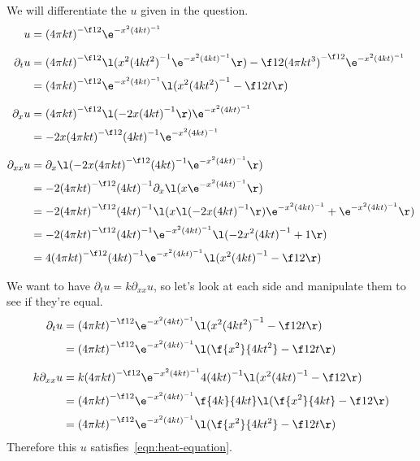 \documentclass[a4paper]{article}
\begin{document}
We will differentiate the $u$ given in the question.
\begin{align*}
u &= {(4\pi kt)}^{-\f12} \e^{-x^2 {(4kt)}^{-1}} \\[1.5ex]
%
\partial_t u &= {(4\pi kt)}^{-\f12} \l( x^2 {(4k t^2)}^{-1} \e^{-x^2 {(4kt)}^{-1}} \r)
    - \f12 {(4\pi k t^3)}^{-\f12} \e^{-x^2 {(4kt)}^{-1}} \\[0.5ex]
&= {(4\pi kt)}^{-\f12} \e^{-x^2 {(4kt)}^{-1}} \l(
    x^2 {(4k t^2)}^{-1} - \f1{2t}
\r) \\[1.5ex]
%
\partial_x u &= {(4\pi kt)}^{-\f12} \l( -2x {(4kt)}^{-1} \r) \e^{-x^2 {(4kt)}^{-1}} \\[0.5ex]
&= -2x {(4\pi kt)}^{-\f12} {(4kt)}^{-1} \e^{-x^2 {(4kt)}^{-1}} \\[1.5ex]
%
\partial_{xx} u &= \partial_x \l( -2x {(4\pi kt)}^{-\f12} {(4kt)}^{-1} \e^{-x^2 {(4kt)}^{-1}} \r) \\[0.5ex]
&= -2 {(4\pi kt)}^{-\f12} {(4kt)}^{-1} \partial_x \l( x \e^{-x^2 {(4kt)}^{-1}} \r) \\[0.5ex]
&= -2 {(4\pi kt)}^{-\f12} {(4kt)}^{-1} \l(
    x \l( -2x {(4kt)}^{-1} \r) \e^{-x^2 {(4kt)}^{-1}}
    + \e^{-x^2 {(4kt)}^{-1}}
\r) \\[0.5ex]
&= -2 {(4\pi kt)}^{-\f12} {(4kt)}^{-1} \e^{-x^2 {(4kt)}^{-1}} \l( -2x^2 {(4kt)}^{-1} + 1 \r) \\[0.5ex]
&= 4 {(4\pi kt)}^{-\f12} {(4kt)}^{-1} \e^{-x^2 {(4kt)}^{-1}} \l( x^2 {(4kt)}^{-1} - \f12 \r)
\end{align*}

We want to have $\partial_t u = k \partial_{xx} u$, so let's look at each side and manipulate them to see if they're equal.
\begin{align*}
\partial_t u &= {(4\pi kt)}^{-\f12} \e^{-x^2 {(4kt)}^{-1}} \l(
    x^2 {(4k t^2)}^{-1} - \f1{2t}
\r) \\[0.5ex]
&= {(4\pi kt)}^{-\f12} \e^{-x^2 {(4kt)}^{-1}} \l(
    \f{x^2}{4k t^2} - \f1{2t}
\r) \\[1.5ex]
%
k \partial_{xx} u &= k {(4\pi kt)}^{-\f12} \e^{-x^2 {(4kt)}^{-1}} 4 {(4kt)}^{-1} \l(
    x^2 {(4kt)}^{-1} - \f12
\r) \\[0.5ex]
&= {(4\pi kt)}^{-\f12} \e^{-x^2 {(4kt)}^{-1}} \f{4k}{4kt} \l(
    \f{x^2}{4kt} - \f12
\r) \\[0.5ex]
&= {(4\pi kt)}^{-\f12} \e^{-x^2 {(4kt)}^{-1}} \l(
    \f{x^2}{4kt^2} - \f1{2t}
\r)
\end{align*}
Therefore this $u$ satisfies~\eqref{eqn:heat-equation}.
\end{document}
